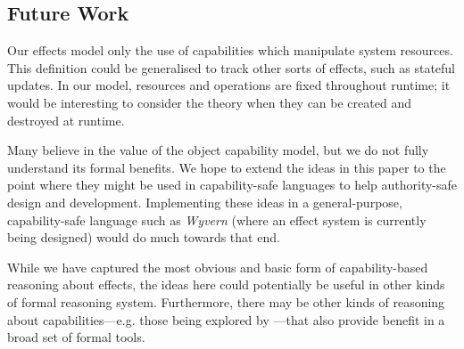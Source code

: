 \subsection{Future Work}

Our effects model only the use of capabilities which manipulate system resources. This definition could be generalised to track other sorts of effects, such as stateful updates. In our model, resources and operations are fixed throughout runtime; it would be interesting to consider the theory when they can be created and destroyed at runtime.

Many believe in the value of the object capability model, but we do not fully understand its formal benefits. We hope to extend the ideas in this paper to the point where they might be used in capability-safe languages to help authority-safe design and development. Implementing these ideas in a general-purpose, capability-safe language such as \textit{Wyvern} (where an effect system is currently being designed) would do much towards that end.

While we have captured the most obvious and basic form of capability-based reasoning about effects, the ideas here could potentially be useful in other kinds of formal reasoning system.
Furthermore, there may be other kinds of reasoning about capabilities---e.g. those being explored by \cite{drossopoulou07}---that also provide benefit in a broad set of formal tools.

